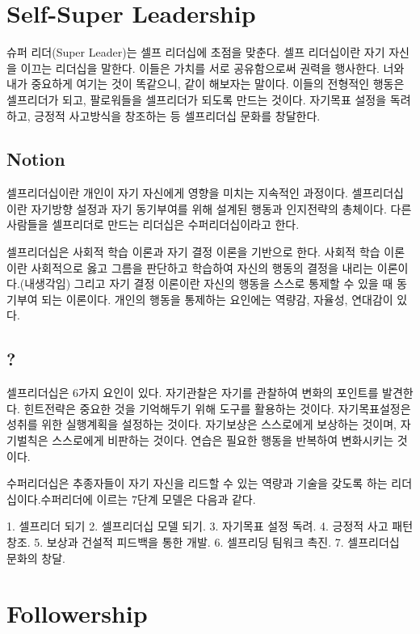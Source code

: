\section{Self-Super Leadership}

슈퍼 리더(Super Leader)는 셀프 리더십에 초점을 맞춘다. 셀프 리더십이란 자기
자신을 이끄는 리더십을 말한다. 이들은 가치를 서로 공유함으로써 권력을 행사한다.
너와 내가 중요하게 여기는 것이 똑같으니, 같이 해보자는 말이다. 이들의 전형적인
행동은 셀프리더가 되고, 팔로워들을 셀프리더가 되도록 만드는 것이다. 자기목표
설정을 독려하고, 긍정적 사고방식을 창조하는 등 셀프리더십 문화를 창달한다.

\subsection{Notion}

셀프리더십이란 개인이 자기 자신에게 영향을 미치는 지속적인 과정이다.
셀프리더십이란 자기방향 설정과 자기 동기부여를 위해 설계된 행동과 인지전략의
총체이다. 다른 사람들을 셀프리더로 만드는 리더십은 수퍼리더십이라고 한다.

셀프리더십은 사회적 학습 이론과 자기 결정 이론을 기반으로 한다. 사회적 학습
이론이란 사회적으로 옳고 그름을 판단하고 학습하여 자신의 행동의 결정을 내리는
이론이다.(내생각임) 그리고 자기 결정 이론이란 자신의 행동을 스스로 통제할 수
있을 때 동기부여 되는 이론이다. 개인의 행동을 통제하는 요인에는 역량감, 자율성,
연대감이 있다.


\subsection{?}

셀프리더십은 6가지 요인이 있다. 자기관찰은 자기를 관찰하여 변화의 포인트를
발견한다. 힌트전략은 중요한 것을 기억해두기 위해 도구를 활용하는 것이다.
자기목표설정은 성취를 위한 실행계획을 설정하는 것이다. 자기보상은 스스로에게
보상하는 것이며, 자기벌칙은 스스로에게 비판하는 것이다. 연습은 필요한 행동을
반복하여 변화시키는 것이다.

수퍼리더십은 추종자들이 자기 자신을 리드할 수 있는 역량과 기술을 갖도록 하는
리더십이다.수퍼리더에 이르는 7단계 모델은 다음과 같다. 

1. 셀프리더 되기 2. 셀프리더십 모델 되기. 3. 자기목표 설정 독려. 4. 긍정적 사고 패턴 창조. 
5. 보상과 건설적 피드백을 통한 개발. 6. 셀프리딩 팀워크 촉진. 7. 셀프리더십 문화의 창달.

\section{Followership}

